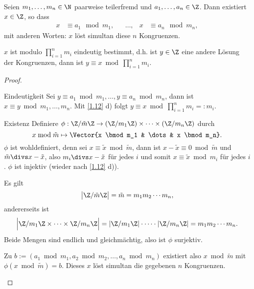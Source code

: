 \begin{st} \label{1.13}
	Seien $m_1, \dotsc, m_n \in \N$ paarweise teilerfremd und $a_1, \dotsc, a_n \in \Z$.
	Dann existiert $x \in \Z$, so dass
	\begin{align*}
		x &\equiv a_1 \mod m_1,&
		&\dotsc,&
		x &\equiv a_n \mod m_n,
	\end{align*}
	mit anderen Worten: $x$ löst simultan diese $n$ Kongruenzen.

	$x$ ist modulo $\prod_{i=1}^n m_i$ eindeutig bestimmt, d.h. ist $y \in \Z$ eine andere Lösung der Kongruenzen, dann ist $y \equiv x \bmod \prod_{i=1}^n m_i$.
	\begin{proof}
		\begin{segnb}{Eindeutigkeit}
			Sei $y \equiv a_1 \bmod m_1, \dotsc, y \equiv a_n \bmod m_n$, dann ist $x \equiv y \bmod m_1, \dotsc, m_n$.
			Mit \ref{1.12} d) folgt $y \equiv x \bmod \prod_{i=1}^n m_i =: m_i$.
		\end{segnb}
		\begin{seg}{Existenz}
			Definiere $\phi: \Z / \tilde m \Z \to (\Z / m_1 \Z) \times \dotsb \times (\Z / m_n \Z)$ durch
			\[
				x \bmod \tilde m
				\mapsto
				\Vector{x \bmod m_1 & \dots & x \bmod m_n}.
			\]
			$\phi$ ist wohldefiniert, denn sei $x \equiv \tilde x \bmod \tilde m$, dann ist $x - \tilde x \equiv 0 \bmod \tilde m$ und $\tilde m \divs x - \tilde x$, also $m_i \divs x - \tilde x$ für jedes $i$ und somit $x \equiv \tilde x \bmod m_i$ für jedes $i$.
			$\phi$ ist injektiv (wieder nach \ref{1.12} d)).

			Es gilt
			\[
				\big| \Z / \tilde m \Z \big|
				= \tilde m
				= m_1 m_2 \dotsb m_n,
			\]
			andererseits ist
			\[
				\Big| \Z/ m_1 \Z \times \dotsb \times \Z / m_n \Z \Big|
				= | \Z / m_1 \Z | \cdot \dotsb \cdot | \Z / m_n \Z|
				= m_1 m_2 \dotsb m_n.
			\]
			Beide Mengen sind endlich und gleichmächtig, also ist $\phi$ surjektiv.

			Zu $b := (a_1 \bmod m_1, a_2 \bmod m_2, \dotsc, a_n \bmod m_n)$ existiert also $x \bmod \tilde m$ mit $\phi(x \bmod \tilde m) = b$.
			Dieses $x$ löst simultan die gegebenen $n$ Kongruenzen.
		\end{seg}
	\end{proof}
\end{st}

